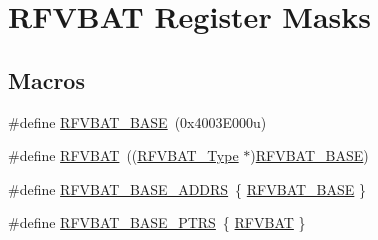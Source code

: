 \hypertarget{group___r_f_v_b_a_t___register___masks}{}\section{R\+F\+V\+B\+AT Register Masks}
\label{group___r_f_v_b_a_t___register___masks}
\subsection*{Macros}
\begin{DoxyCompactItemize}
\item 
\#define \mbox{\hyperlink{group___r_f_v_b_a_t___register___masks_gad95e9110d4335fec45f55c54ed3f4814}{R\+F\+V\+B\+A\+T\+\_\+\+B\+A\+SE}}~(0x4003\+E000u)
\item 
\#define \mbox{\hyperlink{group___r_f_v_b_a_t___register___masks_gac2c2895b56604565c1deab90aedbf1a4}{R\+F\+V\+B\+AT}}~((\mbox{\hyperlink{struct_r_f_v_b_a_t___type}{R\+F\+V\+B\+A\+T\+\_\+\+Type}} $\ast$)\mbox{\hyperlink{group___r_f_v_b_a_t___register___masks_gad95e9110d4335fec45f55c54ed3f4814}{R\+F\+V\+B\+A\+T\+\_\+\+B\+A\+SE}})
\item 
\#define \mbox{\hyperlink{group___r_f_v_b_a_t___register___masks_ga25ff0ced97c85e35f9cb02f4fac888dd}{R\+F\+V\+B\+A\+T\+\_\+\+B\+A\+S\+E\+\_\+\+A\+D\+D\+RS}}~\{ \mbox{\hyperlink{group___r_f_v_b_a_t___register___masks_gad95e9110d4335fec45f55c54ed3f4814}{R\+F\+V\+B\+A\+T\+\_\+\+B\+A\+SE}} \}
\item 
\#define \mbox{\hyperlink{group___r_f_v_b_a_t___register___masks_gab0495e22a00c365211c3c8510feca9f2}{R\+F\+V\+B\+A\+T\+\_\+\+B\+A\+S\+E\+\_\+\+P\+T\+RS}}~\{ \mbox{\hyperlink{group___r_f_v_b_a_t___register___masks_gac2c2895b56604565c1deab90aedbf1a4}{R\+F\+V\+B\+AT}} \}
\end{DoxyCompactItemize}
